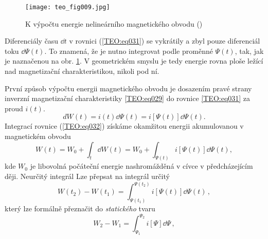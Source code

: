       \begin{figure}[ht!] %
        \centering
        \texttt{[image: teo\_fig009.jpg]}
        \caption{K výpočtu energie nelineárního magnetického obvodu
                 (\cite[s.~158]{Patocka4})}
        \label{teo:fig009}
      \end{figure}
      Diferenciály času \(\dd{t}\) v rovnici (\ref{TEO:eq031}) se vykrátily a zbyl pouze 
      diferenciál toku \(\dd{\Psi(t)}\). To znamená, že je nutno integrovat podle proměnné 
      \(\Psi(t)\), tak, jak je naznačenou na obr. \ref{teo:fig009}. V geometrickém smyslu je tedy 
      energie rovna ploše ležící nad magnetizační charakteristikou, nikoli pod ní.

      První způsob výpočtu energii magnetického obvodu je dosazením pravé strany 
      inverzní magnetizační charakteristiky \ref{TEO:eq029} do rovnice \ref{TEO:eq031} za proud 
      \(i(t)\). 
      \begin{equation}\label{TEO:eq032}
        dW(t) = i(t)\dd{\Psi(t)} = i[\Psi(t)]\dd{\Psi(t)}.
      \end{equation}
      Integrací rovnice (\ref{TEO:eq032}) získáme okamžitou energii akumulovanou v magnetickém 
      obvodu
      \begin{equation}\label{TEO:eq033}
        W(t) = W_0 + \int_t\dd{W(t)} = W_0 + \int_{\Psi(t)}i[\Psi(t)]\dd{\Psi(t)},
      \end{equation}
      kde \(W_0\) je libovolná počáteční energie nashromážděná v cívce v předcházejícím ději. 
      Neurčitý integrál Lze přepsat na integrál určitý
      \begin{equation}\label{TEO:eq034}
        \boxed{W(t_2) - W(t_1)  = \int_{\Psi(t_1)}^{\Psi(t_2)}i[\Psi(t)]\dd{\Psi(t)}}\,,
      \end{equation}
      který lze formálně přeznačit do \emph{statického} tvaru
      \begin{equation}\label{TEO:eq035}
        \boxed{W_2 - W_1  = \int_{\Psi_1}^{\Psi_2}i[\Psi]\dd{\Psi}}\,,
      \end{equation}
      
